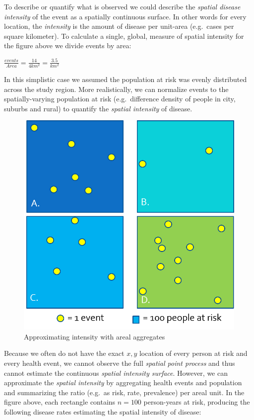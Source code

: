 \documentclass[
]{book}
\begin{document}
To describe or quantify what is observed we could describe the \emph{spatial disease intensity} of the event as a spatially continuous surface. In other words for every location, the \emph{intensity} is the amount of disease per unit-area (e.g.~cases per square kilometer). To calculate a single, global, measure of spatial intensity for the figure above we divide events by area:

\(\frac{events}{Area}=\frac{14}{4km^{2}}=\frac{3.5}{km^{2}}\)

In this simplistic case we assumed the population at risk was evenly distributed across the study region. More realistically, we can normalize events to the spatially-varying population at risk (e.g.~difference density of people in city, suburbs and rural) to quantify the \emph{spatial intensity} of disease.

\begin{figure}
\centering
\includegraphics{images/point-process-2.png}
\caption{\label{fig:unnamed-chunk-4}Approximating intensity with areal aggregates}
\end{figure}

Because we often do not have the exact \(x,y\) location of every person at risk and every health event, we cannot observe the full \emph{spatial point process} and thus cannot estimate the continuous \emph{spatial intensity surface}. However, we can approximate the \emph{spatial intensity} by aggregating health events and population and summarizing the ratio (e.g.~as risk, rate, prevalence) per areal unit. In the figure above, each rectangle contains \(n=100\) person-years at risk, producing the following disease rates estimating the spatial intensity of disease:
\end{document}
